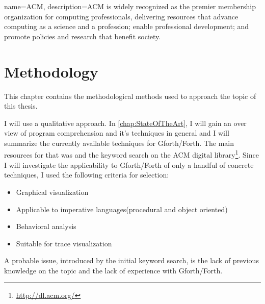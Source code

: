{
  name={ACM},
  description={ACM is widely recognized as the premier membership organization for computing professionals, delivering resources that advance computing as a science and a profession; enable professional development; and promote policies and research that benefit society.}
}


\chapter{Methodology}
\label{chap:Methodology}

This chapter contains the methodological methods used to approach the topic of this thesis.

I will use a qualitative approach. In \autoref{chap:StateOfTheArt}, I will gain an over view of program comprehension and it's techniques in general and I will summarize the currently available techniques for Gforth/Forth. The main resources for that was \cite{Cornelissen:2009:SSP:1638616.1639301} and the keyword search on the \gls{ACM} digital library\footnote{\url{http://dl.acm.org/}}.
Since I will investigate the applicability to Gforth/Forth of only a handful of concrete techniques, I used the following criteria for selection:
\begin{itemize}
\item Graphical visualization 
\item Applicable to imperative languages(procedural and object oriented)
\item Behavioral analysis
\item Suitable for trace visualization
\end{itemize}
A probable issue, introduced by the initial keyword search, is the lack of previous knowledge on the topic and the lack of experience with Gforth/Forth.


